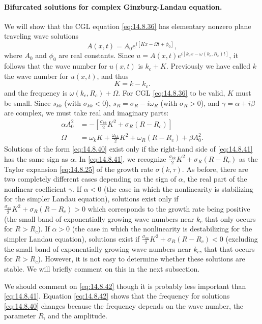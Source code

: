 \paragraph{Bifurcated solutions for complex Ginzburg-Landau equation.}
We will show that the CGL equation \eqref{eq:14.8.36} has elementary nonzero plane traveling wave solutions
\begin{equation}
A(x,t) = A_0 e^{i[Kx - \Omega t + \phi_0]},
\label{eq:14.8.40}
\end{equation}
where $A_0$ and $\phi_0$ are real constants. Since $u = A(x,t)e^{i[k_c x - \omega(k_c, R_c)t]}$, it follows that the wave number for $u(x,t)$ is $k_c + K$. Previously we have called $k$ the wave number for $u(x,t)$, and thus
\[
K = k - k_c.
\]
and the frequency is $\omega(k_c, R_c) + \Omega$. For CGL \eqref{eq:14.8.36} to be valid, $K$ must be small. Since $s_{kk}$ (with $\sigma_{kk} < 0$), $s_R = \sigma_R - i\omega_R$ (with $\sigma_R > 0$), and $\gamma = \alpha + i\beta$ are complex, we must take real and imaginary parts:
\begin{align}
\alpha A_0^2 &= -[\frac{\sigma_{kk}}{2}K^2 + \sigma_R(R - R_c)] \label{eq:14.8.41} \\
\Omega &= \omega_k K + \frac{\omega_{kk}}{2}K^2 + \omega_R(R - R_c) + \beta A_0^2. \label{eq:14.8.42}
\end{align}
Solutions of the form \eqref{eq:14.8.40} exist only if the right-hand side of \eqref{eq:14.8.41} has the same sign as $\alpha$. In \eqref{eq:14.8.41}, we recognize $\frac{\sigma_{kk}}{2}K^2 + \sigma_R(R - R_c)$ as the Taylor expansion \eqref{eq:14.8.25} of the growth rate $\sigma(k,\tau)$. As before, there are two completely different cases depending on the sign of $\alpha$, the real part of the nonlinear coefficient $\gamma$. If $\alpha < 0$ (the case in which the nonlinearity is stabilizing for the simpler Landau equation), solutions exist only if $\frac{\sigma_{kk}}{2}K^2 + \sigma_R(R - R_c) > 0$ which corresponds to the growth rate being positive (the small band of exponentially growing wave numbers near $k_c$ that only occurs for $R > R_c$). If $\alpha > 0$ (the case in which the nonlinearity is destabilizing for the simpler Landau equation), solutions exist if $\frac{\sigma_{kk}}{2}K^2 + \sigma_R(R - R_c) < 0$ (excluding the small band of exponentially growing wave numbers near $k_c$, that that occurs for $R > R_c$). However, it is not easy to determine whether these solutions are stable. We will briefly comment on this in the next subsection.

We should comment on \eqref{eq:14.8.42} though it is probably less important than \eqref{eq:14.8.41}. Equation \eqref{eq:14.8.42} shows that the frequency for solutions \eqref{eq:14.8.40} changes because the frequency depends on the wave number, the parameter $R$, and the amplitude.

